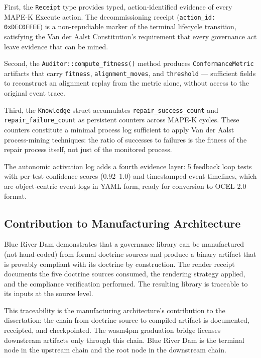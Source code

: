 First, the \texttt{Receipt} type provides typed, action-identified evidence
of every MAPE-K Execute action. The decommissioning receipt
(\texttt{action\_id: 0xDEC0FFEE}) is a non-repudiable marker of the terminal
lifecycle transition, satisfying the Van der Aalst Constitution's requirement
that every governance act leave evidence that can be mined.

Second, the \texttt{Auditor::compute\_fitness()} method produces
\texttt{ConformanceMetric} artifacts that carry \texttt{fitness},
\texttt{alignment\_moves}, and \texttt{threshold} --- sufficient fields to
reconstruct an alignment replay from the metric alone, without access to the
original event trace.

Third, the \texttt{Knowledge} struct accumulates \texttt{repair\_success\_count}
and \texttt{repair\_failure\_count} as persistent counters across MAPE-K cycles.
These counters constitute a minimal process log sufficient to apply Van der
Aalst process-mining techniques: the ratio of successes to failures is the
fitness of the repair process itself, not just of the monitored process.

The autonomic activation log adds a fourth evidence layer: 5 feedback loop
tests with per-test confidence scores (0.92--1.0) and timestamped event
timelines, which are object-centric event logs in YAML form, ready for
conversion to OCEL 2.0 format.

\subsection{Contribution to Manufacturing Architecture}
\label{sec:blue-river-dam-contribution-manufacturing}

Blue River Dam demonstrates that a governance library can be manufactured
(not hand-coded) from formal doctrine sources and produce a binary artifact
that is provably compliant with its doctrine by construction. The render
receipt documents the five doctrine sources consumed, the rendering strategy
applied, and the compliance verification performed. The resulting library is
traceable to its inputs at the source level.

This traceability is the manufacturing architecture's contribution to the
dissertation: the chain from doctrine source to compiled artifact is documented,
receipted, and checkpointed. The wasm4pm graduation bridge licenses downstream
artifacts only through this chain. Blue River Dam is the terminal node in the
upstream chain and the root node in the downstream chain.

